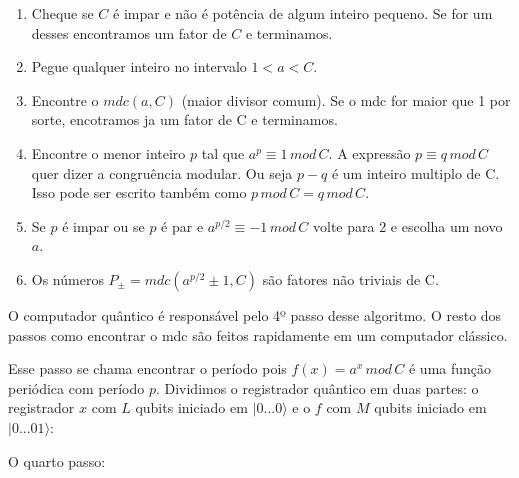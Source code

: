 \documentclass[12pt,a4paper]{article}
\begin{document}
\begin{enumerate}

 \item Cheque se $C$ é impar e não é potência de algum inteiro pequeno. Se for um desses encontramos um fator de $C$ e terminamos.

 \item Pegue qualquer inteiro no intervalo $1 < a < C$.

 \item Encontre o $mdc(a, C)$ (maior divisor comum). Se o mdc for maior que 1 por sorte, encotramos ja um fator de C e terminamos.

 \item Encontre o menor inteiro $p$ tal que $a^{p} \equiv 1\, mod\, C$. A expressão  $p \equiv q \, mod\, C$ quer dizer a congruência modular. Ou seja $p-q$ é um inteiro multiplo de C. Isso pode ser escrito também como $p\, mod\, C = q\, mod\, C$.

 \item Se $p$ é impar ou se $p$ é par e $a^{p/2} \equiv -1\, mod\, C$ volte para 2 e escolha um novo $a$.

 \item Os números $P_{\pm} = mdc( a^{p/2} \pm 1, C)$ são fatores não triviais de C.

\end{enumerate}

O computador quântico é responsável pelo 4º passo desse algoritmo. O resto dos passos como encontrar o mdc são feitos rapidamente em um computador clássico.

Esse passo se chama encontrar o período pois $f(x)=a^{x} \, mod \, C$ é uma função periódica com período $p$. Dividimos o registrador quântico em duas partes: o registrador $x$ com $L$ qubits iniciado em $|0...0\rangle$ e o $f$ com $M$ qubits iniciado em $|0...01\rangle$:

O quarto passo:
\end{document}
